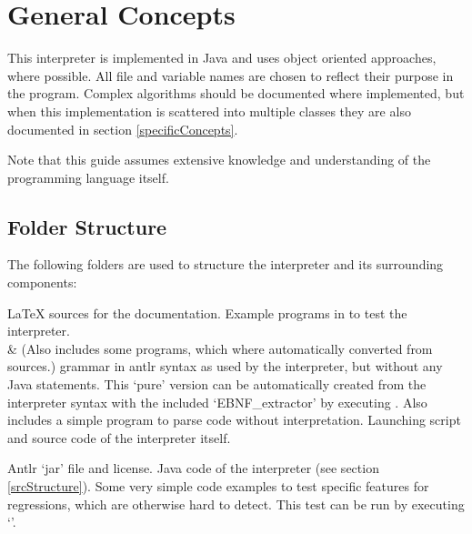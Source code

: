 \section{General Concepts}

This interpreter is implemented in Java and uses object oriented approaches, where possible. All file and variable names are chosen to reflect their purpose in the program. Complex algorithms should be documented where implemented, but when this implementation is scattered into multiple classes they are also documented in section \ref{specificConcepts}.

Note that this guide assumes extensive knowledge and understanding of the \SetlX{} programming language itself.


\subsection{Folder Structure}

The following folders are used to structure the interpreter and its surrounding components:

\begin{itemize}
			{\LaTeX{} sources for the documentation.}
			{Example programs in \SetlX{} to test the interpreter.\\&
			 (Also includes some programs, which where automatically converted from \SetlTwo{} sources.)}
			{\SetlX{} grammar in antlr syntax as used by the interpreter, but without any Java statements. This `pure' version can be automatically created from the interpreter syntax with the included `EBNF\_extractor' by executing . Also includes a simple program to parse \SetlX{} code without interpretation.}
			{Launching script and source code of the interpreter itself.}
	\begin{itemize}
				{Antlr `jar' file and license.}
				{Java code of the interpreter (see section \ref{srcStructure}).}
				{Some very simple \SetlX{} code examples to test specific features for regressions, which are otherwise hard to detect. This test can be run by executing `'.}
	\end{itemize}
\end{itemize}

